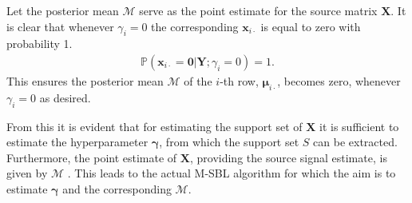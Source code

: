 Let the posterior mean $\mathcal{M}$ serve as the point estimate for the source matrix $\mathbf{X}$.
It is clear that whenever $\gamma_i = 0$ the corresponding $\textbf{x}_{i\cdot}$ is equal to zero with probability 1.
\begin{align*}
\mathbb{P}(\mathbf{x}_{i \cdot} = \mathbf{0} \vert \mathbf{Y} ; \gamma_i = 0) = 1.
\end{align*}
This ensures the posterior mean $\mathcal{M}$ of the $i$-th row, $\boldsymbol{\mu}_{i \cdot}$, becomes zero, whenever $\gamma_i = 0$ as desired.

From this it is evident that for estimating the support set of $\mathbf{X}$ it is sufficient to estimate the hyperparameter $\boldsymbol{\gamma}$, from which the support set $S$ can be extracted. Furthermore, the point estimate of $\mathbf{X}$, providing the source signal estimate, is given by $\mathcal{M}$ \cite[p. 147]{phd_wipf}. 
This leads to the actual M-SBL algorithm for which the aim is to estimate $\boldsymbol{\gamma}$ and the corresponding $\mathcal{M}$.

